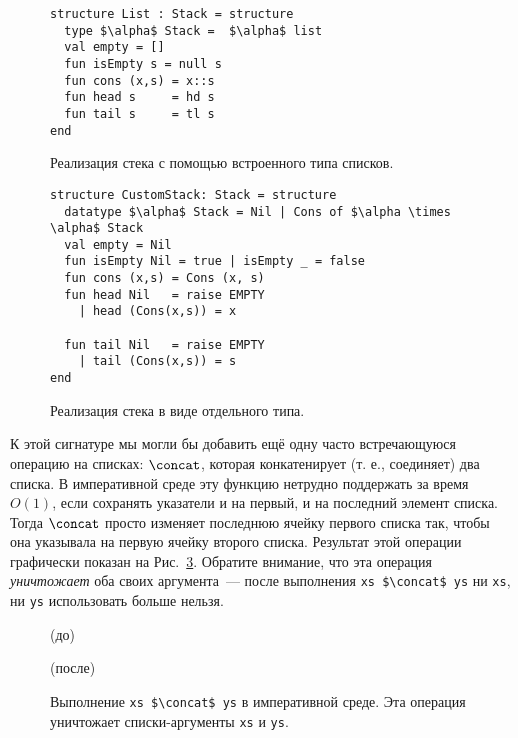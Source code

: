 \begin{figure}
\begin{lstlisting}
structure List : Stack = structure
  type $\alpha$ Stack =  $\alpha$ list
  val empty = []
  fun isEmpty s = null s
  fun cons (x,s) = x::s
  fun head s     = hd s
  fun tail s     = tl s
end
\end{lstlisting}
\caption{Реализация стека с помощью встроенного типа списков.}\label{fig:2.2}
\end{figure}

\begin{figure}
\begin{lstlisting}
structure CustomStack: Stack = structure
  datatype $\alpha$ Stack = Nil | Cons of $\alpha \times \alpha$ Stack
  val empty = Nil
  fun isEmpty Nil = true | isEmpty _ = false
  fun cons (x,s) = Cons (x, s)
  fun head Nil   = raise EMPTY
    | head (Cons(x,s)) = x

  fun tail Nil   = raise EMPTY
    | tail (Cons(x,s)) = s
end
\end{lstlisting}
  \caption{Реализация стека в виде отдельного типа.}
  \label{fig:2.3}
\end{figure}

К этой сигнатуре мы могли бы добавить ещё одну часто встречающуюся
операцию на списках: $\concat$, которая конкатенирует (т. е.,
соединяет) два списка. В императивной среде эту функцию нетрудно
поддержать за время $O(1)$, если сохранять указатели и на первый, и на
последний элемент списка.  Тогда $\concat$ просто изменяет последнюю
ячейку первого списка так, чтобы она указывала на первую ячейку
второго списка.  Результат этой операции графически показан на
Рис.~\ref{fig:2.4}. Обратите внимание, что эта операция
\emph{уничтожает} оба своих аргумента~--- после выполнения
\lstinline!xs $\concat$ ys! ни \lstinline!xs!, ни \lstinline!ys! использовать
больше нельзя.

\begin{figure}[h]
  \centering
	\par
  (до)\par
	\vspace{0.5cm}
	\par
  (после)\par
	\vspace{0.5cm}
  \caption{Выполнение \lstinline!xs $\concat$ ys! в императивной среде. Эта операция уничтожает списки-аргументы \lstinline!xs! и \lstinline!ys!.}
  \label{fig:2.4}
\end{figure}

